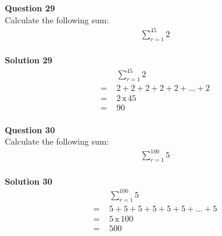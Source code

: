 \documentclass{article}
\begin{document}
\noindent\textbf{Question 29}\\[5pt]
Calculate the following sum:
\begin{align*}
\sum_{r=1}^{45} 2
\end{align*}\\[5pt]
\noindent\textbf{Solution 29}\\[5pt]
\begin{align*}
&\sum_{r=1}^{45} 2\\[2pt]
=\,\,&2+2+2+2+2+...+2\\[2pt]
=\,\,&2 \, \text{x} \, 45\\[2pt]
=\,\,&90
\end{align*}\\[10pt]

\noindent\textbf{Question 30}\\[5pt]
Calculate the following sum:
\begin{align*}
\sum_{r=1}^{100} 5
\end{align*}\\[5pt]
\noindent\textbf{Solution 30}\\[5pt]
\begin{align*}
&\sum_{r=1}^{100} 5\\[2pt]
=\,\,&5+5+5+5+5+5+...+5\\[2pt]
=\,\,&5 \, \text{x} \, 100\\[2pt]
=\,\,&500
\end{align*}\\[10pt]
\end{document}
